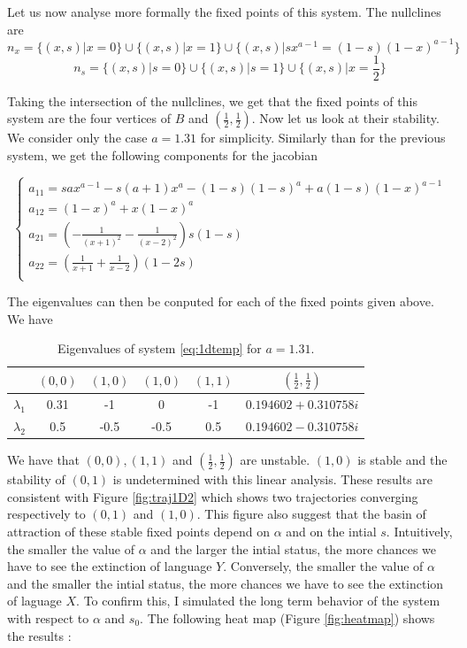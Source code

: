 \documentclass{article}
\begin{document}
Let us now analyse more formally the fixed points of this system.
The nullclines are
$$n_x = \{(x,s) | x=0 \} \cup \{ (x,s)| x = 1 \} \cup \{ (x,s) | sx^{a-1} = (1-s)(1-x)^{a-1} \}$$
$$n_s = \{(x,s) | s=0 \} \cup \{ (x,s)| s = 1 \} \cup \{ (x,s) | x= \frac{1}{2} \}$$

Taking the intersection of the nullclines, we get that the fixed points of this system are the four vertices of $B$ and $(\frac{1}{2}, \frac{1}{2})$.
Now let us look at their stability.
We consider only the case $a=1.31$ for simplicity.
Similarly than for the previous system, we get the following components for the jacobian

\[
\begin{cases}
a_{11} = sax^{a-1} - s(a+1)x^a - (1-s)(1-s)^a + a(1-s)(1-x)^{a-1} \\
a_{12} = (1-x)^a + x(1-x)^a \\
a_{21} = (-\frac{1}{(x+1)^2}-\frac{1}{(x-2)^2})s(1-s) \\
a_{22} = (\frac{1}{x+1}+\frac{1}{x-2})(1-2s) \\
\end{cases}
\]

The eigenvalues can then be conputed for each of the fixed points given above.
We have
\begin{table}[h]
  \centering
  \begin{tabular}{cccccc}
    & $(0,0)$ & $(1,0)$ & $(1,0)$ & $(1,1)$ & $(\frac{1}{2}, \frac{1}{2})$ \\
    \hline
    $\lambda_1$ & 0.31 & -1 & 0 & -1 & $0.194602+0.310758i$ \\
    \hline
    $\lambda_2$ & 0.5 & -0.5 & -0.5 & 0.5 & $0.194602-0.310758i$ \\
    \hline
  \end{tabular}
  \caption{Eigenvalues of system \ref{eq:1dtemp} for $a=1.31$.}
  \label{tab:eig}
\end{table}

We have that $(0,0), (1,1)$ and $(\frac{1}{2}, \frac{1}{2})$ are unstable. $(1,0)$ is stable and the stability of $(0,1)$ is undetermined with this linear analysis.
These results are consistent with Figure \ref{fig:traj1D2} which shows two trajectories converging respectively to $(0,1)$ and $(1,0)$.
This figure also suggest that the basin of attraction of these stable fixed points depend on $\alpha$ and on the intial $s$.
Intuitively, the smaller the value of $\alpha$ and the larger the intial status, the more chances we have to see the extinction of language $Y$.
Conversely, the smaller the value of $\alpha$ and the smaller the intial status, the more chances we have to see the extinction of laguage $X$.
To confirm this, I simulated the long term behavior of the system with respect to $\alpha$ and $s_0$.
The following heat map (Figure \ref{fig:heatmap}) shows the results :
\end{document}
